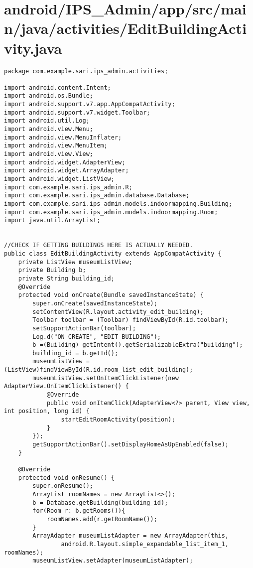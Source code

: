 \section{android/IPS\_Admin/app/src/main/java/activities/EditBuildingActivity.java}
\begin{lstlisting}package com.example.sari.ips_admin.activities;

import android.content.Intent;
import android.os.Bundle;
import android.support.v7.app.AppCompatActivity;
import android.support.v7.widget.Toolbar;
import android.util.Log;
import android.view.Menu;
import android.view.MenuInflater;
import android.view.MenuItem;
import android.view.View;
import android.widget.AdapterView;
import android.widget.ArrayAdapter;
import android.widget.ListView;
import com.example.sari.ips_admin.R;
import com.example.sari.ips_admin.database.Database;
import com.example.sari.ips_admin.models.indoormapping.Building;
import com.example.sari.ips_admin.models.indoormapping.Room;
import java.util.ArrayList;


//CHECK IF GETTING BUILDINGS HERE IS ACTUALLY NEEDED.
public class EditBuildingActivity extends AppCompatActivity {
    private ListView museumListView;
    private Building b;
    private String building_id;
    @Override
    protected void onCreate(Bundle savedInstanceState) {
        super.onCreate(savedInstanceState);
        setContentView(R.layout.activity_edit_building);
        Toolbar toolbar = (Toolbar) findViewById(R.id.toolbar);
        setSupportActionBar(toolbar);
        Log.d("ON CREATE", "EDIT BUILDING");
        b =(Building) getIntent().getSerializableExtra("building");
        building_id = b.getId();
        museumListView = (ListView)findViewById(R.id.room_list_edit_building);
        museumListView.setOnItemClickListener(new AdapterView.OnItemClickListener() {
            @Override
            public void onItemClick(AdapterView<?> parent, View view, int position, long id) {
                startEditRoomActivity(position);
            }
        });
        getSupportActionBar().setDisplayHomeAsUpEnabled(false);
    }

    @Override
    protected void onResume() {
        super.onResume();
        ArrayList roomNames = new ArrayList<>();
        b = Database.getBuilding(building_id);
        for(Room r: b.getRooms()){
            roomNames.add(r.getRoomName());
        }
        ArrayAdapter museumListAdapter = new ArrayAdapter(this,
                android.R.layout.simple_expandable_list_item_1, roomNames);
        museumListView.setAdapter(museumListAdapter);


\end{lstlisting}
